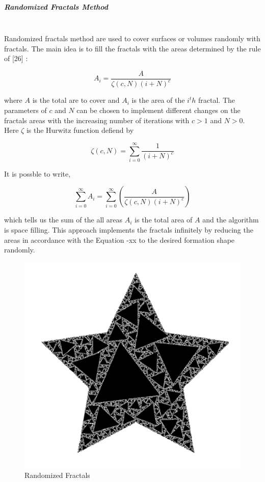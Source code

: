 \subparagraph{Randomized Fractals Method}\hspace{0pt} \\
Randomized fractals method are used to cover surfaces or volumes randomly with fractals. The main idea is to fill the fractals with the areas determined by the rule of [26] :

\begin{equation}
A_i = \frac{A}{\zeta(c,N)(i+N)^c}
\end{equation}

where $A$ is the total are to cover and $A_i$ is the area of the $i^th$ fractal. The parameters of $c$ and $N$ can be chosen to implement different changes on the fractals areas with the increasing number of iterations with $c>1$ and $N>0$. Here  $\zeta$ is the Hurwitz function defiend by

\begin{equation}
\zeta(c,N) = \sum_{i=0}^{\infty} \frac{1}{(i+N)^c}
\end{equation}

It is possble to write, 
	
\begin{equation}
\sum_{i=0}^{\infty}A_i = \sum_{i = 0}^{\infty}\left(\frac{A}{\zeta(c,N)(i+N)^c}\right)
\end{equation}
	
which tells us the sum of the all areas $A_i$ is the total area of $A$ and the algorithm is space filling. This approach implements the fractals infinitely by reducing the areas in accordance with the Equation -xx to the desired formation shape randomly. 

\begin{figure}[H]
\caption{Randomized Fractals}
\centering
\includegraphics[scale = 0.70]{randomized}
\end{figure}
	

